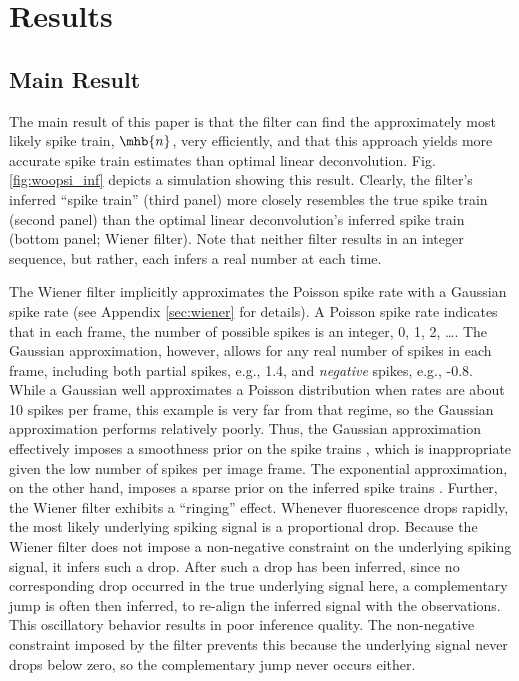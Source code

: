\section{Results} \label{sec:results}

\subsection{Main Result} \label{sec:main}

The main result of this paper is that the \foopsi filter can find the approximately most likely spike train, $\mhb{n}$, very efficiently, and that this approach yields more accurate spike train estimates than optimal linear deconvolution.  Fig. \ref{fig:woopsi_inf} depicts a simulation showing this result. Clearly, the \foopsi filter's inferred ``spike train'' (third panel) more closely resembles the true spike train (second panel) than the optimal linear deconvolution's inferred spike train (bottom panel; Wiener filter).  Note that neither filter results in an integer sequence, but rather, each infers a real number at each time.

The Wiener filter implicitly approximates the Poisson spike rate with a Gaussian spike rate (see Appendix \ref{sec:wiener} for details).  A Poisson spike rate indicates that in each frame, the number of possible spikes is an integer, 0, 1, 2, \ldots.  The Gaussian approximation, however, allows for any real number of spikes in each frame, including both partial spikes, e.g., 1.4, and \emph{negative} spikes, e.g., -0.8.  While a Gaussian well approximates a Poisson distribution when rates are about 10 spikes per frame, this example is very far from that regime, so the Gaussian approximation performs relatively poorly.  Thus, the Gaussian approximation effectively imposes a smoothness prior on the spike trains \cite{WuGallant06}, which is inappropriate given the low number of spikes per image frame.  The exponential approximation, on the other hand, imposes a sparse prior on the inferred spike trains \cite{Seeger08}.  Further, the Wiener filter exhibits a ``ringing'' effect.  Whenever fluorescence drops rapidly, the most likely underlying spiking signal is a proportional drop.  Because the Wiener filter does not impose a non-negative constraint on the underlying spiking signal, it infers such a drop.  After such a drop has been inferred, since no corresponding drop occurred in the true underlying signal here, a complementary jump is often then inferred, to re-align the inferred signal with the observations.  This oscillatory behavior results in poor inference quality. The non-negative constraint imposed by the \foopsi filter prevents this because the underlying signal never drops below zero, so the complementary jump never occurs either.

